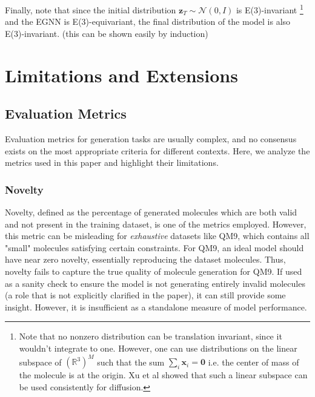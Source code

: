 \documentclass[sigconf]{acmart}
\begin{document}
Finally, note that since the initial distribution $\mathbf{z}_T \sim \mathcal{N}(0, I)$ is E(3)-invariant
\footnote{Note that no nonzero distribution can be translation invariant, since it wouldn't integrate to one. 
However, one can use distributions on the linear subspace of $(\mathbb{R}^3)^M$ such that the sum $\sum_i \mathbf{x}_i = \mathbf{0}$ i.e. the center of mass of the molecule is at the origin.
Xu et al \cite{xu} showed that such a linear subspace can be used consistently for diffusion.}
and the EGNN is E(3)-equivariant, the final distribution of the model is also E(3)-invariant. (this can be shown easily by induction)

\section{Limitations and Extensions}
\subsection{Evaluation Metrics}
Evaluation metrics for generation tasks are usually complex, and no consensus exists on the most appropriate criteria for different contexts. Here, we analyze the metrics used in this paper and highlight their limitations.

\subsubsection{Novelty}
Novelty, defined as the percentage of generated molecules which are both valid and not present in the training dataset, is one of the metrics employed. However, this metric can be misleading for \textit{exhaustive} datasets like QM9, which contains all "small" molecules satisfying certain constraints. For QM9, an ideal model should have near zero novelty, essentially reproducing the dataset molecules. Thus, novelty fails to capture the true quality of molecule generation \cite{vignac2022topnequivariantsetgraph} for QM9. If used as a sanity check to ensure the model is not generating entirely invalid molecules (a role that is not explicitly clarified in the paper), it can still provide some insight. However, it is insufficient as a standalone measure of model performance.
\end{document}
